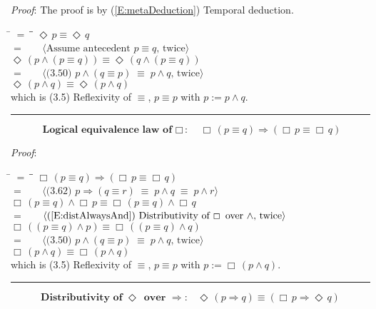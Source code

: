 \documentclass[12pt, fleqn, leqno]{article}
\newcommand{\lgap}{2pt}                             %
\newcommand{\mymathindent}{24pt}                    %
\newcommand{\equivs}{\ensuremath{\;\equiv\;}}       %
\newcommand{\impl}{\ensuremath{\Rightarrow}}        %
\newcommand{\Event}{\Diamond\,}
\newcommand{\Always}{\Box\,}
\newcommand{\myqed}{\rule[-.23ex]{1.2ex}{2.0ex}}
\newcommand{\myqedtab}{\hspace{384pt}}              %
\newcommand{\Gll} {\langle}                         %
\newcommand{\Ggg} {\rangle}                         %
\newcommand{\Hint}[1]     {\ \ \ $\Gll              \mbox{#1} \Ggg$ }   %
\begin{document}
\emph{Proof}: The proof is by (\ref{E:metaDeduction}) Temporal deduction.
\begin{tabbing}
\hspace{\mymathindent} \= $= \;$ \= \myqedtab \= \kill
  \> \>   $\Event p \equiv \Event q$\\[\lgap]
  \> $=$  \>  \Hint{Assume antecedent $p\equiv q$, twice}\\[\lgap]
  \> \>   $\Event (p \land (p\equiv q)) \equiv \Event (q \land (p\equiv q))$\\[\lgap]
  \> $=$  \>  \Hint{(3.50) $p\land (q\equiv p)\equivs p\land q$, twice}\\[\lgap]
  \> \>   $\Event (p \land q) \equiv \Event (p \land q)$\\[\lgap]
  \> which is (3.5) Reflexivity of $\equiv$, $p\equiv p$ with $p:=p \land q$. \quad \myqed
  \end{tabbing}
\begin{equation}\label{E:distAlwaysEquiv}
\textbf{Logical equivalence law of $\Always$:}\quad \Always (p \equiv q) \impl (\Always p \equiv \Always q)
\end{equation}

\emph{Proof}:
\begin{tabbing}
\hspace{\mymathindent} \= $= \;$ \= \myqedtab \= \kill
  \> \>   $\Always (p \equiv q) \impl (\Always p \equiv \Always q)$\\[\lgap]
  \> $=$  \>  \Hint{(3.62) $p\impl (q\equiv r) \equivs p\land q\equivs p\land r$}\\[\lgap]
  \> \>   $\Always (p \equiv q) \land \Always p \equiv \Always (p \equiv q) \land \Always q$\\[\lgap]
  \> $=$  \>  \Hint{(\ref{E:distAlwaysAnd}) Distributivity of $\Always$ over $\land$, twice}\\[\lgap]
  \> \>   $\Always((p \equiv q) \land p) \equiv \Always((p \equiv q) \land q)$\\[\lgap]
  \> $=$  \>  \Hint{(3.50) $p\land (q\equiv p)\equivs p\land q$, twice}\\[\lgap]
  \> \>   $\Always(p \land q) \equiv \Always (p \land q)$\\[\lgap]
  \> which is (3.5) Reflexivity of $\equiv$, $p\equiv p$ with $p:=\Always(p \land q)$. \quad \myqed
\end{tabbing}
\begin{equation}\label{E:eventImpAlways}
\textbf{Distributivity of $\Event$ over $\impl$:}\quad \Event (p \impl q) \equiv (\Always p \impl \Event q)
\end{equation}
\end{document}
